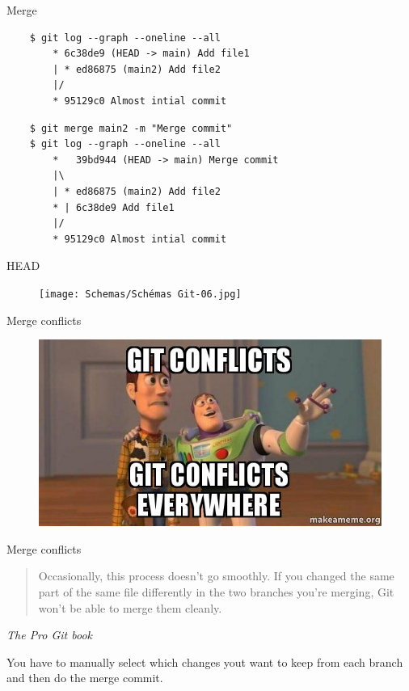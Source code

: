 \documentclass[10pt,aspectratio=169]{beamer}
\begin{document}
\begin{frame}[fragile]{Merge}
    \begin{verbatim}
    $ git log --graph --oneline --all
        * 6c38de9 (HEAD -> main) Add file1
        | * ed86875 (main2) Add file2
        |/
        * 95129c0 Almost intial commit
    \end{verbatim}

    \begin{verbatim}
    $ git merge main2 -m "Merge commit"
    $ git log --graph --oneline --all
        *   39bd944 (HEAD -> main) Merge commit
        |\
        | * ed86875 (main2) Add file2
        * | 6c38de9 Add file1
        |/
        * 95129c0 Almost intial commit
    \end{verbatim}

\end{frame}

\begin{frame}[fragile]{HEAD}
    \begin{figure}
        \texttt{[image: Schemas/Schémas Git-06.jpg]}
    \end{figure}
\end{frame}

\begin{frame}[fragile]{Merge conflicts}
    \begin{figure}
        \centering
        \includegraphics[scale=0.8]{memes/meme-conflicts.jpg}
    \end{figure}
\end{frame}

\begin{frame}[fragile]{Merge conflicts}
    \begin{quote}
        Occasionally, this process doesn't go smoothly. If you changed the same part of the same file differently in the two branches you're merging, Git won't be able to merge them cleanly.
    \end{quote}
    \begin{flushright}
        \textit{The Pro Git book}
    \end{flushright}

    You have to manually select which changes yout want to keep from each branch and then do the merge commit.
\end{frame}
\end{document}
